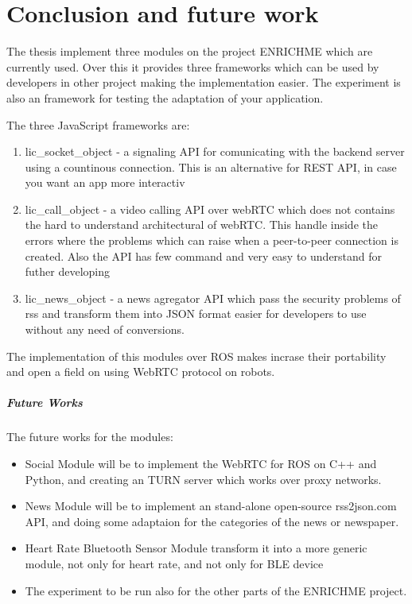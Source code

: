 \chapter{Conclusion and future work}
\label{chapter:conclusion}
The thesis implement three modules on the project ENRICHME which are currently used.
Over this it provides three frameworks which can be used by developers in other
project making the implementation easier. The experiment is also an framework
for testing the adaptation of your application.

The three JavaScript frameworks are:
\begin{enumerate}
    \item lic_socket_object - a signaling API for comunicating with the backend server
    using a countinous connection. This is an alternative for REST API, in case you want
    an app more interactiv
    \item lic_call_object - a video calling API over webRTC which does not contains
    the hard to understand architectural of webRTC. This handle inside the errors where
    the problems which can raise when a peer-to-peer connection is created. Also the API
    has few command and very easy to understand for futher developing
    \item lic_news_object - a news agregator API which pass the security problems of rss
    and transform them into JSON format easier for developers to use without any need
    of conversions.
\end{enumerate}

The implementation of this modules over ROS makes incrase their portability and open
a field on using WebRTC protocol on robots.

\paragraph{Future Works}
The future works for the modules:
\begin{itemize}
\item Social Module will be to implement the WebRTC for ROS on C++ and Python, and creating an TURN server which works over proxy networks. 
\item News Module will be to implement an stand-alone open-source rss2json.com API, and doing some adaptaion for the categories of the news or newspaper.
\item Heart Rate Bluetooth Sensor Module transform it into a more generic module, not only for heart rate, and not only for BLE device
\item The experiment to be run also for the other parts of the ENRICHME project.
\end{itemize}
